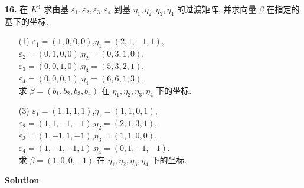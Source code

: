 \documentclass[11pt,a4paper,openany,oneside]{book}
\newcommand\Solution{\noindent\textbf{\textsf{Solution}}\par\medskip}
\begin{document}
\begin{myexample}
\textbf{16.}
在 $ K^4 $ 求由基 $ \varepsilon_1, \varepsilon_2, \varepsilon_3, \varepsilon_4 $ 到基 $ \eta_1, \eta_2, \eta_3, \eta_4 $ 的过渡矩阵, 并求向量 $ \beta $ 在指定的基下的坐标. 
\begin{enumerate}

\item[(1)]  
	$\varepsilon_1 = (1, 0, 0, 0)$,\hspace{1.2em}$ \eta_1 = (2, 1, -1, 1),$\\ 
	$\varepsilon_2 = (0, 1, 0, 0)$,\hspace{1.2em}$ \eta_2 = (0, 3, 1, 0), $\\ 
	$\varepsilon_3 = (0, 0, 1, 0)$,\hspace{1.2em}$ \eta_3 = (5, 3, 2, 1), $\\  
	$\varepsilon_4 = (0 ,0, 0, 1)$.\hspace{1.2em}$ \eta_4 = (6 ,6, 1, 3). $\\ 
求 $ \beta = (b_1, b_2, b_3, b_4) $ 在 $ \eta_1, \eta_2, \eta_3, \eta_4 $ 下的坐标.

\item[(3)]
	$\varepsilon_1 = (1, 1, 1, 1)$,\hspace{2.7em}$ \eta_1 = (1, 1, 0, 1),$\\ 
    $\varepsilon_2 = (1, 1, -1, -1)$,\hspace{1.2em}$ \eta_2 = (2, 1, 3, 1), $\\ 
    $\varepsilon_3 = (1, -1, 1, -1)$,\hspace{1.2em}$ \eta_3 = (1, 1, 0, 0), $\\  
    $\varepsilon_4 = (1 ,-1, -1, 1)$.\hspace{1.2em}$ \eta_4 = (0 ,1, -1, -1). $\\ 
求 $ \beta = (1, 0, 0, -1) $ 在 $ \eta_1, \eta_2, \eta_3, \eta_4 $ 下的坐标. 
\end{enumerate}

\end{myexample}
\Solution
\end{document}
